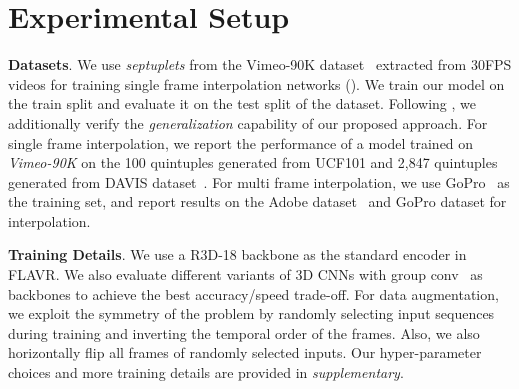 \documentclass[10pt,twocolumn,letterpaper]{article}
\newcommand{\Ours}{FLAVR}
\newcommand{\eightx}{}
\begin{document}
\section{Experimental Setup}

{\bf Datasets}. 
We use \textit{septuplets} from the Vimeo-90K dataset~\cite{xue2019video} extracted from 30FPS videos for training single frame interpolation networks (). We train our model on the train split and evaluate it on the test split of the dataset. Following \cite{xu2019quadratic}, we additionally verify the \textit{generalization} capability of our proposed approach. For single frame interpolation, we report the performance of a model trained on \textit{Vimeo-90K} on the 100 quintuples generated from UCF101\cite{UCF101} and 2,847 quintuples generated from DAVIS dataset~\cite{perazzi2016benchmark}. For multi frame interpolation, we use GoPro~\cite{nah2017deep} as the training set, and report results on the Adobe dataset~\cite{su2017deep} and GoPro dataset\cite{nah2017deep} for \eightx{} interpolation. 


{\bf Training Details}. 
We use a R3D-18 backbone as the standard encoder in \Ours{}. We also evaluate different variants of 3D CNNs with group conv~\cite{Tran19} as backbones to achieve the best accuracy/speed trade-off. 
For data augmentation, we exploit the symmetry of the problem by randomly selecting input sequences during training and inverting the temporal order of the frames. Also, we also horizontally flip all frames of randomly selected inputs. Our hyper-parameter choices and more training details are provided in \emph{supplementary}.
\end{document}

